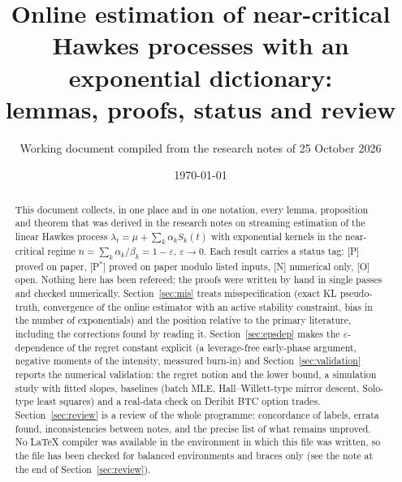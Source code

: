 \documentclass[11pt,a4paper]{article}
\title{Online estimation of near-critical Hawkes processes with an exponential dictionary:\\
lemmas, proofs, status and review}
\author{Working document compiled from the research notes of 25 October 2026}
\date{\today}
\theoremstyle{definition}
\theoremstyle{remark}
\newcommand{\st}[1]{\textsf{\small[#1]}}
\newcommand{\Pt}{\st{P}}
\newcommand{\Ps}{\st{P$^*$}}
\newcommand{\Nt}{\st{N}}
\newcommand{\Ot}{\st{O}}
\newcommand{\eps}{\varepsilon}
\newcommand{\1}{\mathbf 1}
\begin{document}
\maketitle

\begin{abstract}
This document collects, in one place and in one notation, every lemma, proposition and theorem
that was derived in the research notes on streaming estimation of the linear Hawkes process
$\lambda_t=\mu+\sum_{k}\alpha_kS_k(t)$ with exponential kernels in the near-critical regime
$n=\sum_k\alpha_k/\beta_k=1-\eps$, $\eps\to0$.
Each result carries a status tag: \Pt{} proved on paper, \Ps{} proved on paper modulo listed inputs,
\Nt{} numerical only, \Ot{} open.
Nothing here has been refereed; the proofs were written by hand in single passes and checked numerically.
Section~\ref{sec:mis} treats misspecification (exact KL pseudo-truth, convergence of the online estimator with an active stability constraint, bias in the number of exponentials) and the position relative to the primary literature, including the corrections found by reading it.
Section~\ref{sec:epsdep} makes the $\eps$-dependence of the regret constant explicit (a leverage-free early-phase argument, negative moments of the intensity, measured burn-in) and Section~\ref{sec:validation} reports the numerical validation: the regret notion and the lower bound, a simulation study with fitted slopes, baselines (batch MLE, Hall--Willett-type mirror descent, Solo-type least squares) and a real-data check on Deribit BTC option trades.
Section~\ref{sec:review} is a review of the whole programme: concordance of labels, errata found,
inconsistencies between notes, and the precise list of what remains unproved.
No \LaTeX{} compiler was available in the environment in which this file was written, so the file
has been checked for balanced environments and braces only (see the note at the end of Section~\ref{sec:review}).
\end{abstract}

\tableofcontents








\end{document}

